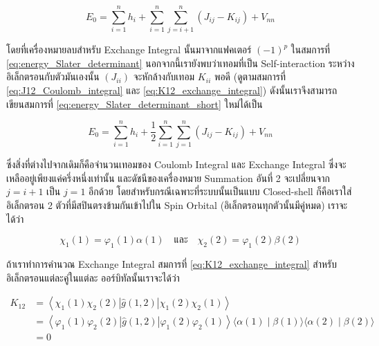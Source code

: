 \begin{equation}
    \label{eq:energy_Slater_determinant_short}
    E_0
    =
    \sum_{i=1}^n h_i
    + \sum_{i=1}^n \sum_{j=i+1}^n
    \left(J_{i j}-K_{i j}\right)
    + V_{n n}
\end{equation}

\noindent โดยที่เครื่องหมายลบสำหรับ Exchange Integral นั้นมาจากแฟคเตอร์ $(-1)^p$ ในสมการที่ \ref{eq:energy_Slater_determinant}
นอกจากนี้เรายังพบว่าเทอมที่เป็น Self-interaction ระหว่างอิเล็กตรอนกับตัวมันเองนั้น $(J_{i i})$ จะหักล้างกับเทอม $K_{i i}$ พอดี
(ดูตามสมการที่ \ref{eq:J12_Coulomb_integral} และ \ref{eq:K12_exchange_integral}) ดังนั้นเราจึงสามารถเขียนสมการที่
\ref{eq:energy_Slater_determinant_short} ใหม่ได้เป็น

\begin{equation}
    \label{eq:energy_Slater_determinant_reduced}
    E_0 = \sum_{i=1}^n h_i
    + \frac{1}{2} \sum_{i=1}^n \sum_{j=1}^n\left(J_{i j}-K_{i j}\right)
    + V_{n n}
\end{equation}

\noindent ซึ่งสิ่งที่ต่างไปจากเดิมก็คือจำนวนเทอมของ Coulomb Integral และ Exchange Integral ซึ่งจะเหลืออยู่เพียงแค่ครึ่งหนึ่งเท่านั้น%
และดัชนีของเครื่องหมาย Summation อันที่ 2 จะเปลี่ยนจาก $j = i+1$ เป็น $j = 1$ อีกด้วย โดยสำหรับกรณีเฉพาะที่ระบบนั้นเป็นแบบ 
Closed-shell ก็คือเราใส่อิเล็กตรอน 2 ตัวที่มีสปินตรงข้ามกันเข้าไปใน Spin Orbital (อิเล็กตรอนทุกตัวนั้นมีคู่หมด) เราจะได้ว่า

\begin{equation}
    \chi_1(1) = \varphi_1(1) \alpha(1)
    \quad \text{และ} \quad
    \chi_2(2) = \varphi_1(2) \beta(2)
\end{equation}

\noindent ถ้าเราทำการคำนวณ Exchange Integral สมการที่ \ref{eq:K12_exchange_integral} สำหรับอิเล็กตรอนแต่ละคู่ในแต่ละ%
ออร์บิทัลนั้นเราจะได้ว่า

\begin{equation}
    \begin{aligned}
        K_{12}
         & = \left\langle\chi_1(1) \chi_2(2)|\hat{g}(1,2)| \chi_1(2) \chi_2(1)\right\rangle \\
         & = \left\langle\varphi_1(1) \varphi_2(2)|\hat{g}(1,2)| \varphi_1(2)
        \varphi_2(1)\right\rangle\langle\alpha(1) \mid \beta(1)\rangle\langle\alpha(2)
        \mid \beta(2)\rangle                                                                \\
         & = 0
    \end{aligned}
\end{equation}

